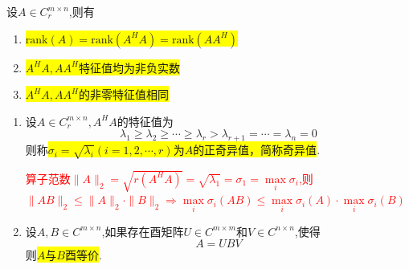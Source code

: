 \begin{theorem}
	设$A\in C^{m\times n}_r$,则有
	\begin{enumerate}
		\item \colorbox{yellow}{$\mathrm{rank}(A)= \mathrm{rank}(A^HA)=\mathrm{rank}(AA^H)  $}
		\item \colorbox{yellow}{$A^HA, AA^H$特征值均为非负实数}
		\item \colorbox{yellow}{$A^HA, AA^H$的非零特征值相同}
	\end{enumerate}
\end{theorem}

\begin{definition}
\begin{enumerate}
	\item 设$A\in C^{m \times n}_r, A^HA$的特征值为
	\[
	\lambda_1\geq\lambda_2\geq\cdots\geq \lambda_r>\lambda_{r+1}=\cdots=\lambda_n=0
	\]
	则称\colorbox{yellow}{$\sigma_i=\sqrt{\lambda_i}(i=1,2,\cdots,r)$为$A$的正奇异值，简称奇异值}.
	 \begin{note}
		\textcolor{red}{算子范数$\|A\|_2=\sqrt{r(A^HA)}=\sqrt{\lambda_1}=\sigma_1=\max\limits_i\sigma_i$,则\\
	$\|AB\|_2\leq\|A\|_2\cdot\|B\|_2\Rightarrow \max\limits_i\sigma_i(AB)\leq\max\limits_i\sigma_i(A)\cdot\max\limits_i\sigma_i(B)$	
	}
	\end{note}

\item 设$A,B \in C^{m\times n}$,如果存在酉矩阵$U\in C^{m\times m}$和$V\in C^{n\times n}$,使得
\[
A=UBV
\]则\colorbox{yellow}{$A$与$B$酉等价}.
\end{enumerate}
\end{definition}

